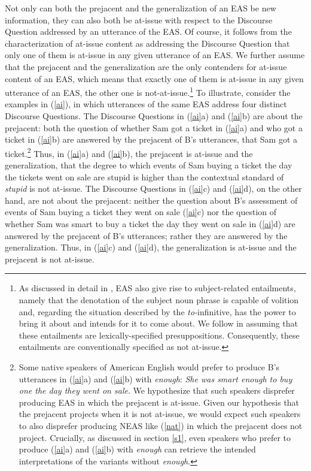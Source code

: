 \documentclass[11pt,fleqn]{article}
\newcommand{\6}{\mbox{$[\hspace*{-.6mm}[$}}
\newcommand{\9}{\mbox{$]\hspace*{-.6mm}]$}}
\begin{document}
Not only can both the prejacent and the generalization of an EAS be new information, they can also both be at-issue with respect to the Discourse Question addressed by an utterance of the EAS. Of course, it follows from the characterization of at-issue content as addressing the Discourse Question that only one of them is at-issue in any given utterance of an EAS. We further assume that the prejacent and the generalization are the only contenders for at-issue content of an EAS, which means that exactly one of them is at-issue in any given utterance of an EAS, the other one is not-at-issue.\footnote{As discussed in detail in \citealt[\S4.2]{barker02}, EAS also give rise to subject-related entailments, namely that the denotation of the subject noun phrase is capable of volition and, regarding the situation described by the {\em to-}infinitive, has the power to bring it about and intends for it to come about. We follow \citealt{barker02} in assuming that these entailments are lexically-specified presuppositions. Consequently, these entailments are conventionally specified as not at-issue.} To illustrate, consider the examples in (\ref{ai}), in which utterances of the same EAS address four distinct Discourse Questions. The Discourse Questions in (\ref{ai}a) and (\ref{ai}b) are about the prejacent: both the question of whether Sam got a ticket in (\ref{ai}a) and who got a ticket in (\ref{ai}b) are answered by the prejacent of B's utterances, that Sam got a ticket.\footnote{Some native speakers of American English would prefer to produce B's utterances in (\ref{ai}a) and (\ref{ai}b) with {\em enough}: {\em She was smart enough to buy one the day they went on sale}. We hypothesize that such speakers disprefer producing EAS in which the prejacent is at-issue. Given our hypothesis that the prejacent projects when it is not at-issue, we would expect such speakers to also disprefer producing NEAS like (\ref{nat}) in which the prejacent does not project. Crucially, as discussed in section \ref{s1}, even speakers who prefer to produce (\ref{ai}a) and (\ref{ai}b) with {\em enough} can retrieve the intended interpretations of the variants without {\em enough}.} Thus, in (\ref{ai}a) and (\ref{ai}b), the prejacent is at-issue and the generalization, that the degree to which events of Sam buying a ticket the day the tickets went on sale are stupid is higher than the contextual standard of {\em stupid} is not at-issue. The Discourse Questions in (\ref{ai}c) and (\ref{ai}d), on the other hand, are not about the prejacent:  neither the question about B's assessment of events of Sam buying a ticket they went on sale (\ref{ai}c) nor the question of whether Sam was smart to buy a ticket the day they went on sale in (\ref{ai}d) are answered by the prejacent of B's utterances; rather they are answered by the generalization. Thus, in (\ref{ai}c) and (\ref{ai}d), the generalization is at-issue and the prejacent is not at-issue.
\end{document}
